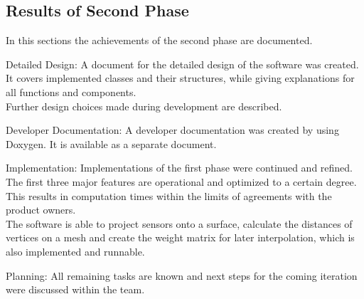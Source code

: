 \subsection{Results of Second Phase}
In this sections the achievements of the second phase are documented.
\begin{aims}
	\item[\hspace*{11mm} Detailed Design:]A document for the detailed design of the software was created.
	 It covers implemented classes and their structures, while giving explanations for all functions and components. \\
	 Further design choices made during development are described.

\end{aims}

\begin{aims}	
	\item[\hspace*{11mm} Developer Documentation:]A developer documentation was created by using Doxygen. It is available as a separate document.   
\end{aims}

\begin{aims}
	\item[\hspace*{11mm} Implementation:]Implementations of the first phase were continued and refined. 
	The first three major features are operational and optimized to a certain degree. \\
	This results in computation times within the limits of agreements with the product owners.\\
	 The software is able to project sensors onto a surface, calculate the distances of vertices on a mesh and create  the weight matrix for later interpolation, which is also implemented and runnable. 
\end{aims}

\begin{aims}	
	\item[\hspace*{11mm} Planning:]All remaining tasks are known and next steps for the coming iteration were discussed within the team.   
\end{aims}
